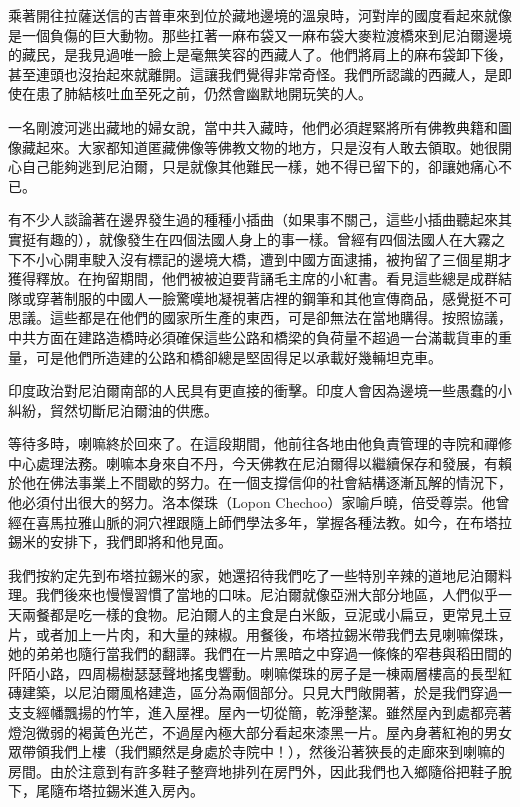 乘著開往拉薩送信的吉普車來到位於藏地邊境的溫泉時，河對岸的國度看起來就像是一個負傷的巨大動物。那些扛著一麻布袋又一麻布袋大麥粒渡橋來到尼泊爾邊境的藏民，是我見過唯一臉上是毫無笑容的西藏人了。他們將肩上的麻布袋卸下後，甚至連頭也沒抬起來就離開。這讓我們覺得非常奇怪。我們所認識的西藏人，是即使在患了肺結核吐血至死之前，仍然會幽默地開玩笑的人。

一名剛渡河逃出藏地的婦女說，當中共入藏時，他們必須趕緊將所有佛教典籍和圖像藏起來。大家都知道匿藏佛像等佛教文物的地方，只是沒有人敢去領取。她很開心自己能夠逃到尼泊爾，只是就像其他難民一樣，她不得已留下的，卻讓她痛心不已。

有不少人談論著在邊界發生過的種種小插曲（如果事不關己，這些小插曲聽起來其實挺有趣的），就像發生在四個法國人身上的事一樣。曾經有四個法國人在大霧之下不小心開車駛入沒有標記的邊境大橋，遭到中國方面逮捕，被拘留了三個星期才獲得釋放。在拘留期間，他們被被迫要背誦毛主席的小紅書。看見這些總是成群結隊或穿著制服的中國人一臉驚嘆地凝視著店裡的鋼筆和其他宣傳商品，感覺挺不可思議。這些都是在他們的國家所生產的東西，可是卻無法在當地購得。按照協議，中共方面在建路造橋時必須確保這些公路和橋梁的負荷量不超過一台滿載貨車的重量，可是他們所造建的公路和橋卻總是堅固得足以承載好幾輛坦克車。

印度政治對尼泊爾南部的人民具有更直接的衝擊。印度人會因為邊境一些愚蠢的小糾紛，貿然切斷尼泊爾油的供應。

等待多時，喇嘛終於回來了。在這段期間，他前往各地由他負責管理的寺院和禪修中心處理法務。喇嘛本身來自不丹，今天佛教在尼泊爾得以繼續保存和發展，有賴於他在佛法事業上不間歇的努力。在一個支撐信仰的社會結構逐漸瓦解的情況下，他必須付出很大的努力。洛本傑珠（Lopon
Chechoo）家喻戶曉，倍受尊崇。他曾經在喜馬拉雅山脈的洞穴裡跟隨上師們學法多年，掌握各種法教。如今，在布塔拉錫米的安排下，我們即將和他見面。

我們按約定先到布塔拉錫米的家，她還招待我們吃了一些特別辛辣的道地尼泊爾料理。我們後來也慢慢習慣了當地的口味。尼泊爾就像亞洲大部分地區，人們似乎一天兩餐都是吃一樣的食物。尼泊爾人的主食是白米飯，豆泥或小扁豆，更常見土豆片，或者加上一片肉，和大量的辣椒。用餐後，布塔拉錫米帶我們去見喇嘛傑珠，她的弟弟也隨行當我們的翻譯。我們在一片黑暗之中穿過一條條的窄巷與稻田間的阡陌小路，四周楊樹瑟瑟聲地搖曳響動。喇嘛傑珠的房子是一棟兩層樓高的長型紅磚建築，以尼泊爾風格建造，區分為兩個部分。只見大門敞開著，於是我們穿過一支支經幡飄揚的竹竿，進入屋裡。屋內一切從簡，乾淨整潔。雖然屋內到處都亮著燈泡微弱的褐黃色光芒，不過屋內極大部分看起來漆黑一片。屋內身著紅袍的男女眾帶領我們上樓（我們顯然是身處於寺院中！），然後沿著狹長的走廊來到喇嘛的房間。由於注意到有許多鞋子整齊地排列在房門外，因此我們也入鄉隨俗把鞋子脫下，尾隨布塔拉錫米進入房內。

